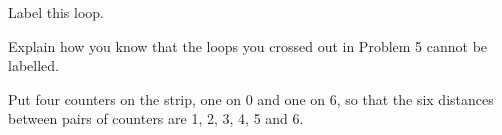 \documentclass[12pt]{article}
\begin{document}
\newpage
{} Label this loop.

\vspace{0.6cm}
\begin{center}
\end{center}

\vspace{1.0cm}
 Explain how you know that the loops you crossed out in Problem 5 cannot be labelled.

\newpage
{} Put four counters on the strip, one on 0 and one on 6, so that the six distances between pairs of counters are 1, 2, 3, 4, 5 and 6.

\vspace{0.5cm}
\begin{center}

\vspace{1.6cm}

\vspace{1.6cm}

\vspace{0.9cm}

\vspace{0.9cm}
\end{center}
\end{document}
